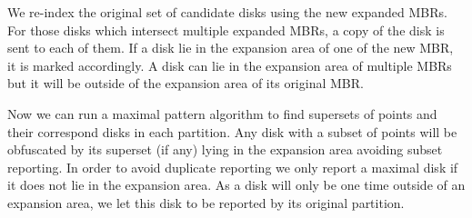 \documentclass[12pt]{scrartcl}
\begin{document}
We re-index the original set of candidate disks using the new expanded MBRs.  For those disks which intersect multiple expanded MBRs, a copy of the disk is sent to each of them. If a disk lie in the expansion area of one of the new MBR, it is marked accordingly. A disk can lie in the expansion area of multiple MBRs but it will be outside of the expansion area of its original MBR. 

Now we can run a maximal pattern algorithm to find supersets of points and their correspond disks in each partition. Any disk with a subset of points will be obfuscated by its superset (if any) lying in the expansion area avoiding subset reporting.  In order to avoid duplicate reporting we only report a maximal disk if it does not lie in the expansion area. As a disk will only be one time outside of an expansion area, we let this disk to be reported by its original partition.
\end{document}
